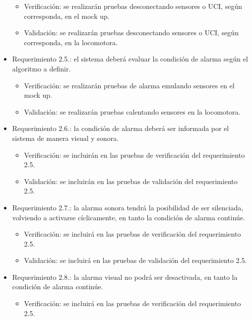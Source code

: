 \documentclass[
11pt, %
codirector, %
]{charter}
\begin{document}
\begin{itemize}
\begin{itemize}
	\item Verificación: se realizarán pruebas desconectando sensores o UCI, según corresponda, en el mock up.
	\item Validación: se realizarán pruebas desconectando sensores o UCI, según corresponda, en la locomotora.
\end{itemize}
\item Requerimiento 2.5.: el sistema deberá evaluar la condición de alarma según el algoritmo a definir. 
\begin{itemize}
	\item Verificación: se realizarán pruebas de alarma emulando sensores en el mock up. 
	\item Validación: se realizarán pruebas calentando sensores en la locomotora.
\end{itemize}
\item Requerimiento 2.6.: la condición de alarma deberá ser informada por el sistema de	manera visual y sonora. 
\begin{itemize}
	\item Verificación: se incluirán en las pruebas de verificación del requerimiento 2.5.
	\item Validación: se incluirán en las pruebas de validación del requerimiento 2.5.
\end{itemize}
\item Requerimiento 2.7.: la alarma sonora tendrá la posibilidad de ser silenciada, 				volviendo a activarse cíclicamente, en tanto la condición de alarma continúe. 
\begin{itemize}
	\item Verificación: se incluirá en las pruebas de verificación del requerimiento 2.5.
	\item Validación: se incluirá en las pruebas de validación del requerimiento 2.5.
\end{itemize}
\item Requerimiento 2.8.: la alarma visual no podrá ser desactivada, en tanto la condición de alarma continúe.  
\begin{itemize}
	\item Verificación: se incluirá en las pruebas de verificación del requerimiento 2.5.

\end{itemize}
\end{itemize}
\end{document}

